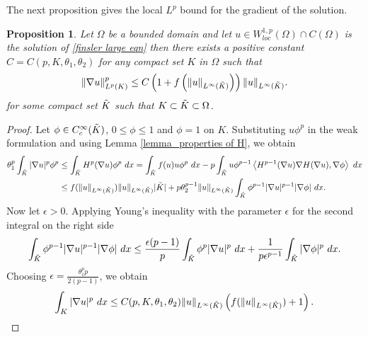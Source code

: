 \documentclass[11pt]{amsart}
\newtheorem{proposition}[theorem]{Proposition}
\newcommand{\Fin}[1]{H^{p-1}(\nabla #1)\nabla H(\nabla #1)}
\numberwithin{equation}{section}
\begin{document}
 The next proposition gives the local $L^{p}$ bound for the gradient of the solution.
 \begin{proposition}\label{prop_grad lp bound}
     Let $\Omega$ be a bounded domain and let $u\in W_{loc}^{1,p}(\Omega)\cap C(\Omega)$ is the solution of \eqref{finsler large eqn} then there exists a positive constant $C=C(p,K, \theta_{1},\theta_{2})$ for any compact set $K$ in $\Omega$ such that  
     \begin{equation*}
         \|\nabla u\|^{p}_{L^{p}(K)}\leq C \left(1+f\left(\|u\|_{L^{\infty}(\Tilde{K})}\right)\right)\|u\|_{L^{\infty}(\Tilde{K})}.
     \end{equation*}
     for some compact set $\Tilde{K}$ such that $K\subset \Tilde{K}\subset \Omega$.
 \end{proposition}
 \begin{proof}
     Let $\phi\in C_{c}^{\infty}(\Tilde{K})$, $0\leq\phi\leq 1$ and $\phi=1$ on $K$. Substituting $u\phi^{p}$ in the weak formulation and using Lemma \ref{lemma_properties of H}, we obtain
     \begin{equation*}
         \begin{split}
             \theta_{1}^{p}\int_{\Tilde{K}}|\nabla u|^{p}\phi^{p} &\leq \int_{\Tilde{K}}H^{p}(\nabla u) \phi^{p}\ dx=\int_{\Tilde{K}}f(u)u\phi^{p}\ dx-p\int_{\Tilde{K}}u\phi^{p-1}\left<\Fin{u}, \nabla \phi\right>\ dx\\
             &\leq f(\|u\|_{L^{\infty}(\Tilde{K})})\|u\|_{L^{\infty}(\Tilde{K})}|\Tilde{K}|+p\theta_{2}^{p-1}\|u\|_{L^{\infty}(\Tilde{K})} \int_{\Tilde{K}}\phi^{p-1}  |\nabla u|^{p-1}|\nabla\phi|\ dx.
         \end{split}
     \end{equation*}
     Now let $\epsilon>0$. Applying Young's inequality with the parameter $\epsilon$ for the second integral on the right side
     \begin{equation*}
         \int_{\Tilde{K}}\phi^{p-1}  |\nabla u|^{p-1}|\nabla\phi|\ dx\leq \frac{\epsilon(p-1)}{p}\int_{\Tilde{K}}\phi^{p}|\nabla u|^{p}\ dx +\frac{1}{p\epsilon^{p-1}}\int_{\Tilde{K}}|\nabla\phi|^{p}\ dx.
     \end{equation*}
     Choosing $\epsilon=\frac{\theta_{1}^{p}p}{2(p-1)}$, we obtain 
     \begin{equation*}
         \int_{K}|\nabla u|^{p}\ dx\leq C(p,K,\theta_{1},\theta_{2})\|u\|_{L^{\infty}(\Tilde{K})}\left(f(\|u\|_{L^{\infty}(\Tilde{K})})+1\right).\qedhere
     \end{equation*}
 \end{proof}
\end{document}
